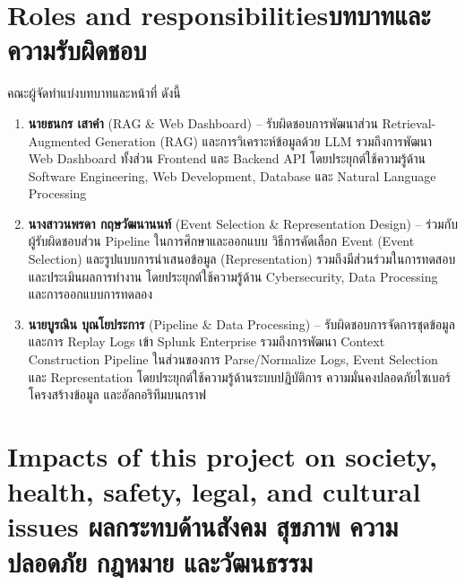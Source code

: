 \section{\ifenglish Roles and responsibilities\else บทบาทและความรับผิดชอบ\fi}

คณะผู้จัดทำแบ่งบทบาทและหน้าที่ ดังนี้
\begin{enumerate}
    \item \textbf{นายธนกร เสาคำ} (RAG \& Web Dashboard) --
          รับผิดชอบการพัฒนาส่วน Retrieval-Augmented Generation (RAG)
          และการวิเคราะห์ข้อมูลด้วย LLM รวมถึงการพัฒนา Web Dashboard
          ทั้งส่วน Frontend และ Backend API
          โดยประยุกต์ใช้ความรู้ด้าน Software Engineering,
          Web Development, Database และ Natural Language Processing

    \item \textbf{นางสาวนพรดา กฤษวัฒนานนท์}
          (Event Selection \& Representation Design) --
          ร่วมกับผู้รับผิดชอบส่วน Pipeline ในการศึกษาและออกแบบ
          วิธีการคัดเลือก Event (Event Selection)
          และรูปแบบการนำเสนอข้อมูล (Representation)
          รวมถึงมีส่วนร่วมในการทดสอบและประเมินผลการทำงาน
          โดยประยุกต์ใช้ความรู้ด้าน Cybersecurity,
          Data Processing และการออกแบบการทดลอง

    \item \textbf{นายบูรณิน บุณโยประการ}
          (Pipeline \& Data Processing) --
          รับผิดชอบการจัดการชุดข้อมูลและการ Replay Logs
          เข้า Splunk Enterprise รวมถึงการพัฒนา Context Construction
          Pipeline ในส่วนของการ Parse/Normalize Logs,
          Event Selection และ Representation
          โดยประยุกต์ใช้ความรู้ด้านระบบปฏิบัติการ
          ความมั่นคงปลอดภัยไซเบอร์ โครงสร้างข้อมูล
          และอัลกอริทึมบนกราฟ
\end{enumerate}

\section{\ifenglish%
Impacts of this project on society, health, safety, legal, and cultural issues
\else%
ผลกระทบด้านสังคม สุขภาพ ความปลอดภัย กฎหมาย และวัฒนธรรม
\fi}


